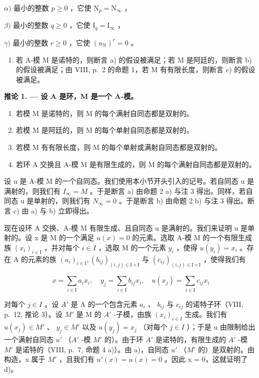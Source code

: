 \(\alpha)\) 最小的整数 \(p \geqslant 0\) ，它使 \(\mathrm{N}_p = \mathrm{N}_{\infty}\) ，

\(\beta)\) 最小的整数 \(q \geqslant 0\) ，它使 \(\mathrm{I}_q = \mathrm{I}_{\infty}\) ，

\(\gamma)\) 最小的整数 \(r \geqslant 0\) ，它使 \((u_{\mathrm{N}})^{r} = 0\) 。

\begin{enumerate}
\def\labelenumi{\arabic{enumi})}
\setcounter{enumi}{2}
\tightlist
\item
  若 A-模 M 是诺特的，则断言 a) 的假设被满足；若 M 是阿廷的，则断言 b) 的假设被满足；由 VIII, p.~2 的命题 1，若 M 有有限长度，则断言 c) 的假设被满足。
\end{enumerate}

\textbf{推论 1. --- 设 A 是环，M 是一个 A-模。}

\begin{enumerate}
\def\labelenumi{\alph{enumi})}
\item
  若模 M 是诺特的，则 M 的每个满射自同态都是双射的。
\item
  若模 M 是阿廷的，则 M 的每个单射自同态都是双射的。
\item
  若模 M 有有限长度，则 M 的每个单射或满射自同态都是双射的。
\item
  若环 A 交换且 A-模 M 是有限生成的，则 M 的每个满射自同态都是双射的。
\end{enumerate}

设 u 是 A-模 M 的一个自同态。我们使用本小节开头引入的记号。若自同态 u 是满射的，则我们有 \(I_{\infty} = M\) 。于是断言 a) 由命题 2 a) 与注 3 得出。同样，若自同态 u 是单射的，则我们有 \(N_{\infty} = 0\) 。于是断言 b) 由命题 2 b) 与注 3 得出。断言 c) 由 a) 与 b) 立即得出。

现在设环 A 交换、A-模 M 有限生成、且自同态 u 是满射的。我们来证明 u 是单射的。设 x 是 M 的一个满足 \(u(x) = 0\) 的元素。选取 A-模 M 的一个有限生成族 \((x_{i})_{i \in \mathrm{I}}\) ，并对每个 \(i \in I\) ，选取 M 的一个元素 \(y_{i}\) ，使得 \(u(y_{i}) = x_{i}\) 。存在 A 的元素的族 \((a_{i})_{i \in \mathrm{I}}, (b_{ij})_{(i,j) \in \mathrm{I} \times \mathrm{I}}\) 与 \((c_{ij})_{(i,j) \in \mathrm{I} \times \mathrm{I}}\) ，使得我们有

\[
x = \sum_ {i \in \mathrm{I}} a _ {i} x _ {i}, \quad y _ {j} = \sum_ {i \in \mathrm{I}} b _ {i j} x _ {i}, \quad u (x _ {j}) = \sum_ {i \in \mathrm{I}} c _ {i j} x _ {i}
\]

对每个 \(j \in I\) 。设 \(A'\) 是 A 的一个包含元素 \(a_i\) 、 \(b_{ij}\) 与 \(c_{ij}\) 的诺特子环（VIII, p.~12, 推论 3）。设 \(M'\) 是 M 的 \(A'\) -子模，由族 \((x_i)_{i \in I}\) 生成。我们有 \(u(x_j) \in M'\) 、 \(y_j \in M'\) 以及 \(u(y_j) = x_j\) （对每个 \(j \in I\) ）；于是 u 由限制给出一个满射自同态 \(u'\) （\(A'\) -模 \(M'\) 的）。由于环 \(A'\) 是诺特的，有限生成的 \(A'\) -模 \(M'\) 是诺特的（VIII, p.~7, 命题 4 a)）。由 a)，自同态 \(u'\) （\(M'\) 的）是双射的。由构造，x 属于 \(M'\) ，且我们有 \(u'(x) = u(x) = 0\) 。因此 x = 0，这就证明了 d)。

